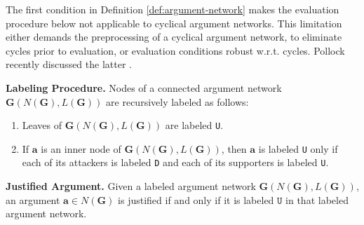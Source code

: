 \documentclass[10pt, conference, compsocconf]{IEEEtran}
\begin{document}
\begin{remark}
The first condition in Definition \ref{def:argument-network} makes the evaluation procedure below not applicable to cyclical argument networks. This limitation either demands the preprocessing of a cyclical argument network, to eliminate cycles prior to evaluation, or evaluation conditions robust w.r.t. cycles. Pollock recently discussed the latter \cite{Pollock:2009:AAI}. 
\end{remark}

\begin{definition}\label{def:labeling-procedure}
	\textbf{Labeling Procedure.}  Nodes of a connected argument network $\textbf{G}(N(\textbf{G}), L(\textbf{G}))$ are recursively labeled as follows:
	\begin{enumerate}
		\item{Leaves of $\textbf{G}(N(\textbf{G}), L(\textbf{G}))$ are labeled \texttt{U}.}
		\item{If $\textbf{a}$ is an inner node of $\textbf{G}(N(\textbf{G}), L(\textbf{G}))$, then $\textbf{a}$ is labeled \texttt{U} only if each of its attackers is labeled \texttt{D} and each of its supporters is labeled \texttt{U}.}
	\end{enumerate}
\end{definition}

\begin{definition}\label{def:justified-argument}
\textbf{Justified Argument.} Given a labeled argument network $\textbf{G}(N(\textbf{G}), L(\textbf{G}))$, an argument $\textbf{a} \in N(\textbf{G})$ is justified if and only if it is labeled $\texttt{U}$ in that labeled argument network.
\end{definition}

\end{document}
